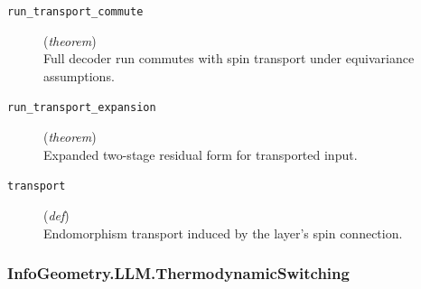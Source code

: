 \documentclass[11pt,a4paper]{article}
\begin{document}
\begin{description}
  \item[\texttt{run\_transport\_commute}] (\textit{theorem}) \\ Full decoder run commutes with spin transport under equivariance assumptions.
  \item[\texttt{run\_transport\_expansion}] (\textit{theorem}) \\ Expanded two-stage residual form for transported input.
  \item[\texttt{transport}] (\textit{def}) \\ Endomorphism transport induced by the layer's spin connection.
\end{description}
\subsubsection*{InfoGeometry.LLM.ThermodynamicSwitching}
\end{document}
